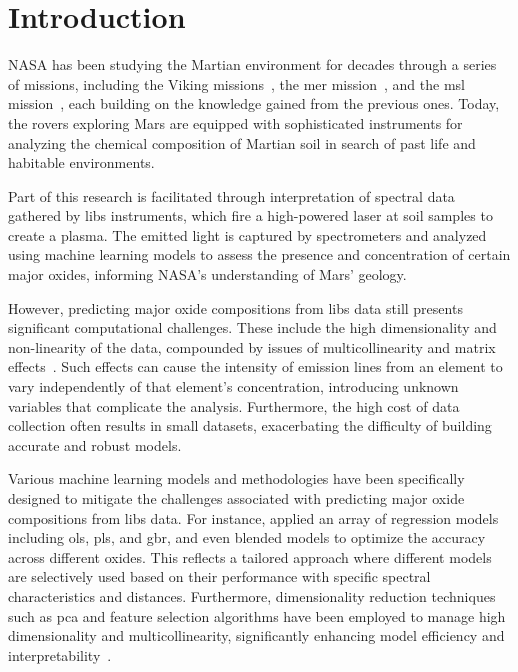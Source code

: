 \section{Introduction}\label{sec:introduction}
NASA has been studying the Martian environment for decades through a series of missions, including the Viking missions~\cite{marsnasagov_vikings}, the \gls{mer} mission~\cite{marsnasagov_observer, marsnasagov_spirit_opportunity}, and the \gls{msl} mission~\cite{marsnasagov_msl}, each building on the knowledge gained from the previous ones.
Today, the rovers exploring Mars are equipped with sophisticated instruments for analyzing the chemical composition of Martian soil in search of past life and habitable environments.

Part of this research is facilitated through interpretation of spectral data gathered by \gls{libs} instruments, which fire a high-powered laser at soil samples to create a plasma.
The emitted light is captured by spectrometers and analyzed using machine learning models to assess the presence and concentration of certain major oxides, informing NASA's understanding of Mars' geology.

However, predicting major oxide compositions from \gls{libs} data still presents significant computational challenges. 
These include the high dimensionality and non-linearity of the data, compounded by issues of multicollinearity and matrix effects~\cite{andersonImprovedAccuracyQuantitative2017}. 
Such effects can cause the intensity of emission lines from an element to vary independently of that element's concentration, introducing unknown variables that complicate the analysis. 
Furthermore, the high cost of data collection often results in small datasets, exacerbating the difficulty of building accurate and robust models.

Various machine learning models and methodologies have been specifically designed to mitigate the challenges associated with predicting major oxide compositions from \gls{libs} data. 
For instance, \citet{andersonPostlandingMajorElement2022} applied an array of regression models including \gls{ols}, \gls{pls}, and \gls{gbr}, and even blended models to optimize the accuracy across different oxides. 
This reflects a tailored approach where different models are selectively used based on their performance with specific spectral characteristics and distances. 
Furthermore, dimensionality reduction techniques such as \gls{pca} and feature selection algorithms have been employed to manage high dimensionality and multicollinearity, significantly enhancing model efficiency and interpretability~\cite{rezaei_dimensionality_reduction}.

